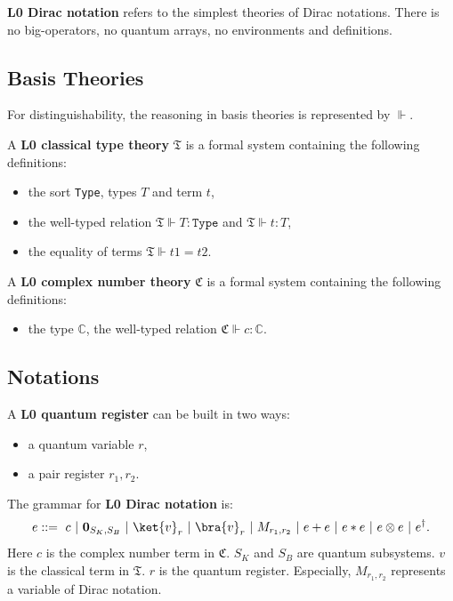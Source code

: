 \textbf{L0 Dirac notation} refers to the simplest theories of Dirac notations. There is no big-operators, no quantum arrays, no environments and definitions.

\subsection{Basis Theories}
For distinguishability, the reasoning in basis theories is represented by $\Vdash$.

\begin{definition}
  A \textbf{L0 classical type theory} $\mathfrak{T}$ is a formal system containing the following definitions:
  \begin{itemize}
    \item the sort \texttt{Type}, types $T$ and term $t$,
    \item the well-typed relation $\mathfrak{T} \Vdash T : \texttt{Type}$ and $\mathfrak{T} \Vdash t : T$,
    \item the equality of terms $\mathfrak{T} \Vdash t1 = t2$.
  \end{itemize}
\end{definition}

\begin{definition}
  A \textbf{L0 complex number theory} $\mathfrak{C}$ is a formal system containing the following definitions:
  \begin{itemize}
    \item the type $\mathbb{C}$, the well-typed relation $\mathfrak{C} \Vdash c : \mathbb{C}$.
  \end{itemize}
\end{definition}

\subsection{Notations}

\begin{definition}
  A \textbf{L0 quantum register} can be built in two ways:
  \begin{itemize}
    \item a quantum variable $r$,
    \item a pair register $r_1, r_2$.
  \end{itemize}
\end{definition}

\begin{definition}
  The grammar for \textbf{L0 Dirac notation} is:
  $$
  e ::=\ c\ |\ \textbf{0}_{S_K, S_B}\ |\ \ket{v}_r\ |\ \bra{v}_r\ |\ M_{r_1, r_2}\ |\ e + e\ |\ e * e\ |\ e \otimes e\ |\ e^\dagger.
  $$
  Here $c$ is the complex number term in $\mathfrak{C}$. $S_K$ and $S_B$ are quantum subsystems. $v$ is the classical term in $\mathfrak{T}$. $r$ is the quantum register. Especially, $M_{r_1, r_2}$ represents a variable of Dirac notation.
\end{definition}

